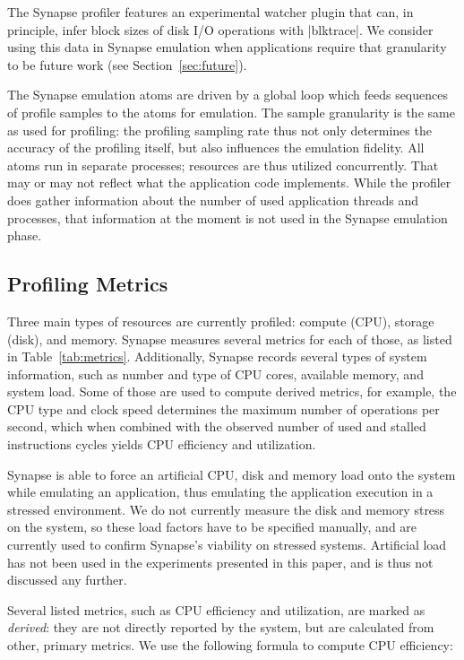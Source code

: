 \documentclass[10pt, conference, compsocconf]{IEEEtran}
\newcommand{\I}[1]{\textit{#1}\xspace}
\newcommand{\synapse}{Synapse\xspace}
\begin{document}
 The \synapse profiler features an experimental watcher plugin that
 can, in principle, infer block sizes of disk I/O operations with
 |blktrace|.  We consider using this data in \synapse emulation when
 applications require that granularity to be future work (see
 Section~\ref{sec:future}). 

 The \synapse emulation atoms are driven by a global loop which feeds
 sequences of profile samples to the atoms for emulation.  The sample
 granularity is the same as used for profiling: the profiling sampling
 rate thus not only determines the accuracy of the profiling itself,
 but also influences the emulation fidelity.  All atoms run in
 separate processes; resources are thus utilized concurrently.  That
 may or may not reflect what the application code implements.  While
 the profiler does gather information about the number of used
 application threads and processes, that information at the moment is
 not used in the \synapse emulation phase.



 \subsection{Profiling Metrics}
 \label{sec:metrics}

 Three main types of resources are currently profiled:
 compute (CPU), storage (disk), and memory.  \synapse measures several
 metrics for each of those, as listed in Table~\ref{tab:metrics}.
 Additionally, \synapse records several types of system information,
 such as number and type of CPU cores, available memory, and system
 load.  Some of those are used to compute derived metrics, for
 example, the CPU type and clock speed determines the maximum number
 of operations per second, which when combined with the observed
 number of used and stalled instructions cycles yields CPU efficiency
 and utilization.

 \synapse is able to force an artificial CPU, disk and memory load onto
 the system while emulating an application, thus emulating the
 application execution in a stressed environment.  We do not currently
 measure the disk and memory stress on the system, so these load
 factors have to be specified manually, and are currently used to
 confirm \synapse's viability on stressed systems.  Artificial load has
 not been used in the experiments presented in this paper, and is thus
 not discussed any further.

 Several listed metrics, such as CPU efficiency and utilization, are
 marked as \I{derived}: they are not directly reported by the system,
 but are calculated from other, primary metrics.  We use the following
 formula to compute CPU efficiency:
\end{document}
